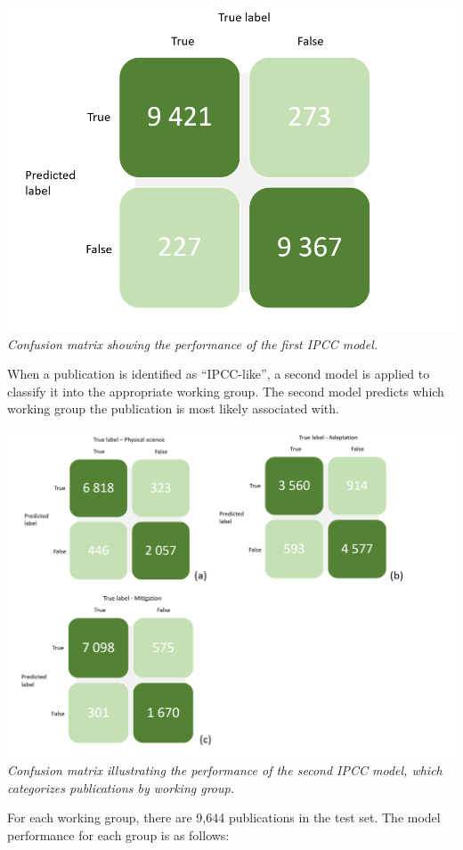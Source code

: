 \documentclass[
]{article}
\begin{document}
\includegraphics{./images/teds_ipcc_model.png} \emph{Confusion matrix
showing the performance of the first IPCC model.}

When a publication is identified as ``IPCC-like'', a second model is
applied to classify it into the appropriate working group. The second
model predicts which working group the publication is most likely
associated with.

\includegraphics{./images/teds_ipcc_model_wg.png} \emph{Confusion matrix
illustrating the performance of the second IPCC model, which categorizes
publications by working group.}

For each working group, there are 9,644 publications in the test set.
The model performance for each group is as follows:
\end{document}
